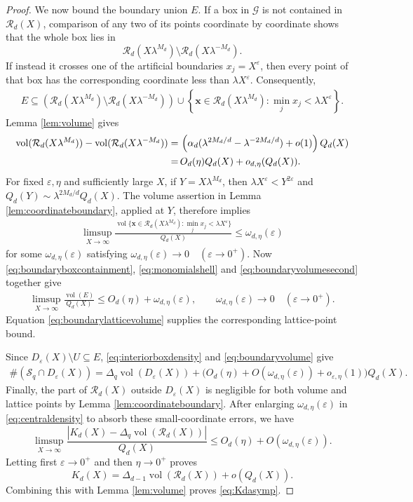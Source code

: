 \documentclass[12pt,a4paper,reqno]{amsart}
\numberwithin{equation}{section}
\newcommand{\cR}{\mathcal R}
\newcommand{\1}{\mathbf 1}
\newcommand{\eps}{\varepsilon}
\DeclareMathOperator{\vol}{vol}
\theoremstyle{plain}
\theoremstyle{definition}
\begin{document}
\begin{proof}
We now bound the boundary union $E$.  If a box in $\mathcal G$ is not
contained in $\cR_d(X)$, comparison of any two of its points
coordinate by coordinate shows that the whole box lies in
\[
 \cR_d(X\lambda^{M_d})
 \setminus\cR_d(X\lambda^{-M_d}).
\]
If instead it crosses one of the artificial boundaries
$x_j=X^\eps$, then every point of that box has the corresponding
coordinate less than $\lambda X^\eps$.  Consequently,
\begin{align}
 E\subseteq
 \left(\cR_d(X\lambda^{M_d})
             \setminus\cR_d(X\lambda^{-M_d})\right)
 \cup
 \left\{\boldsymbol x\in\cR_d(X\lambda^{M_d}):
                  \min_jx_j<\lambda X^\eps\right\}.
\label{eq:boundaryboxcontainment}
\end{align}
Lemma \ref{lem:volume} gives
\begin{align}
 \vol(\cR_d(X\lambda^{M_d}))
 -\vol(\cR_d(X\lambda^{-M_d}))
 =&\,
 \left(\alpha_d
   (\lambda^{2M_d/d}-\lambda^{-2M_d/d})+o(1)\right)Q_d(X)\notag
 \\= &\, O_d(\eta)Q_d(X)+o_{d,\eta}(Q_d(X)).
\label{eq:monomialshell}
\end{align}
For fixed $\eps,\eta$ and sufficiently large $X$, if
$Y=X\lambda^{M_d}$, then $\lambda X^\eps<Y^{2\eps}$ and
$Q_d(Y)\sim\lambda^{2M_d/d}Q_d(X)$.  The volume assertion in Lemma
\ref{lem:coordinateboundary}, applied at $Y$, therefore implies
\begin{align}
 \limsup_{X\to\infty}\frac{\vol\big\{\boldsymbol x\in\cR_d(X\lambda^{M_d}):
                  \min_jx_j<\lambda X^\eps\big\}}{Q_d(X)}
 \leq \omega_{d,\eta}(\eps)
\label{eq:boundaryvolumesecond}
\end{align}
for some $\omega_{d,\eta}(\eps)$ satisfying $\omega_{d,\eta}(\eps)\longrightarrow 0
 \quad(\eps\rightarrow 0^{+})$.
Now \eqref{eq:boundaryboxcontainment}, \eqref{eq:monomialshell} and \eqref{eq:boundaryvolumesecond} together give
\begin{align}
 \limsup_{X\to\infty}\frac{\vol(E)}{Q_d(X)}
 \leq O_d(\eta)+\omega_{d,\eta}(\eps), \qquad \omega_{d,\eta}(\eps)\longrightarrow 0
 \quad(\eps\rightarrow 0^{+}).
\label{eq:boundaryvolume}
\end{align}
Equation \eqref{eq:boundarylatticevolume} supplies the corresponding
lattice-point bound.

Since $D_\eps(X)\setminus U\subseteq E$,
\eqref{eq:interiorboxdensity} and \eqref{eq:boundaryvolume} give
\begin{align}
 \#(\mathcal S_q\cap D_\eps(X))
 =\Delta_q\vol(D_\eps(X))
 +\Big(O_d(\eta)+O(\omega_{d,\eta}(\eps))+o_{\eps,\eta}(1)\Big)Q_d(X).
\label{eq:centraldensity}
\end{align}
Finally, the part of $\cR_d(X)$ outside $D_\eps(X)$ is negligible for
both volume and lattice points by Lemma
\ref{lem:coordinateboundary}.  After enlarging
$\omega_{d,\eta}(\eps)$ in \eqref{eq:centraldensity} to absorb these small-coordinate errors,
we have
\[
 \limsup_{X\to\infty}
 \frac{|K_d(X)-\Delta_q\vol(\cR_d(X))|}{Q_d(X)}
 \leq O_d(\eta)+O(\omega_{d,\eta}(\eps)).
\]
Letting first $\eps\rightarrow 0^{+}$ and then $\eta\rightarrow 0^{+}$ proves
\[
 K_d(X)=\Delta_{d-1}\vol(\cR_d(X))+o(Q_d(X)).
\]
Combining this with Lemma \ref{lem:volume} proves
\eqref{eq:Kdasymp}.
\end{proof}
\end{document}
